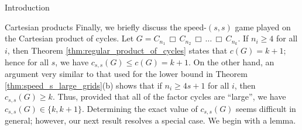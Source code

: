 \documentclass[12pt]{amsart}
\theoremstyle{definition}
\def\cart{\, \Box \,}
\newcommand{\speeds}{c_{s,s}}
\begin{document}
\begin{section}{Introduction}
\begin{section}{Cartesian products}
% 
Finally, we briefly discuss the speed-$(s,s)$ game played on the Cartesian product of cycles.  Let $G = C_{n_1} \cart C_{n_2} \cart \dots \cart C_{n_k}$.  If $n_i \ge 4$ for all $i$, then Theorem \ref{thm:regular_product_of_cycles} states that $c(G) = k+1$; hence for all $s$, we have $\speeds(G) \le c(G) = k+1$.  On the other hand, an argument very similar to that used for the lower bound in Theorem \ref{thm:speed_s_large_grids}(b) shows that if $n_i \ge 4s+1$ for all $i$, then $\speeds(G) \ge k$.  Thus, provided that all of the factor cycles are ``large'', we have $\speeds(G) \in \{k, k+1\}$.  Determining the exact value of $\speeds(G)$ seems difficult in general; however, our next result resolves a special case.  We begin with a lemma.




\end{section}
\end{section}
\end{document}
